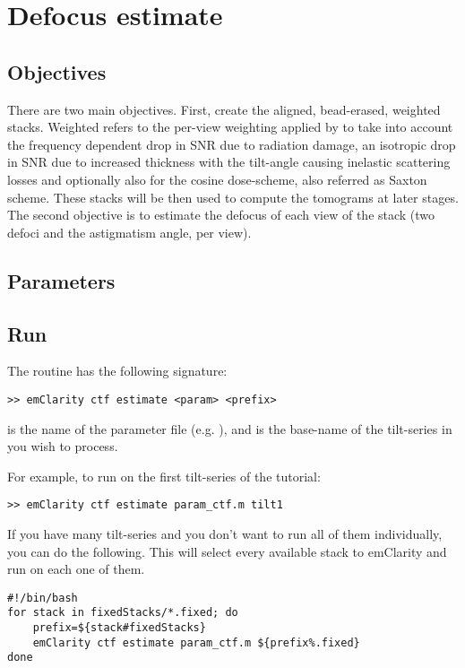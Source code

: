 \section{Defocus estimate} \label{sec:defocus_estimate}

\subsection{Objectives}

There are two main objectives. First, create the aligned, bead-erased, weighted stacks. Weighted refers to the per-view weighting applied by {\emClarity} to take into account the frequency dependent drop in SNR due to radiation damage, an isotropic drop in SNR due to increased thickness with the tilt-angle causing inelastic scattering losses and optionally also for the cosine dose-scheme, also referred as Saxton scheme. These stacks will be then used to compute the tomograms at later stages. The second objective is to estimate the defocus of each view of the stack (two defoci and the astigmatism angle, per view).

\subsection{Parameters}



\subsection{Run}

The  routine has the following signature:
\begin{lstlisting}
>> emClarity ctf estimate <param> <prefix>
\end{lstlisting}
 is the name of the parameter file (e.g. ), and  is the base-name of the tilt-series in  you wish to process.

For example, to run  on the first tilt-series of the tutorial:
\begin{lstlisting}
>> emClarity ctf estimate param_ctf.m tilt1
\end{lstlisting}

If you have many tilt-series and you don't want to run all of them individually, you can do the following. This will select every available stack to emClarity and run  on each one of them.
\begin{lstlisting}
#!/bin/bash
for stack in fixedStacks/*.fixed; do
    prefix=${stack#fixedStacks}
    emClarity ctf estimate param_ctf.m ${prefix%.fixed}
done
\end{lstlisting}

